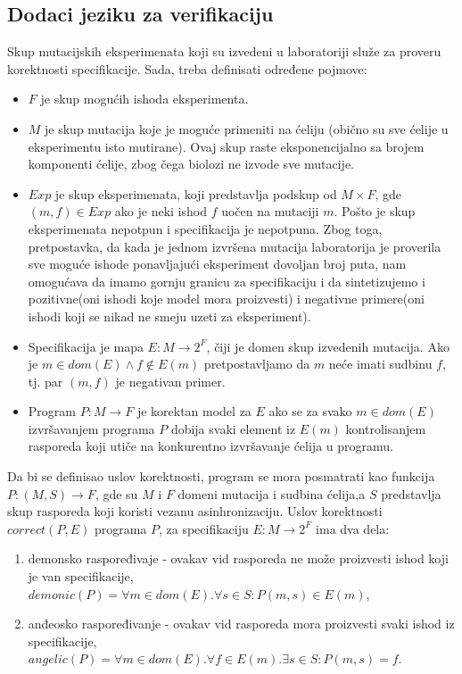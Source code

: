 \documentclass[a4paper]{article}
\begin{document}
\subsection{Dodaci jeziku za verifikaciju}
Skup mutacijskih eksperimenata koji su izvedeni u laboratoriji služe za proveru korektnosti specifikacije. Sada, treba definisati određene pojmove:
\begin{itemize}
\item $F$ je skup mogućih ishoda eksperimenta.
\item $M$ je skup mutacija koje je moguće primeniti na ćeliju (obično su sve ćelije u eksperimentu isto mutirane). Ovaj skup raste eksponencijalno sa brojem komponenti ćelije, zbog čega biolozi ne izvode sve mutacije.
\item $Exp$ je skup eksperimenata, koji predstavlja podskup od $M \times F$, gde $(m,f) \in Exp$ ako je neki ishod $f$ uočen na mutaciji $m$. Pošto je skup eksperimenata nepotpun i specifikacija je nepotpuna. Zbog toga, pretpostavka, da kada je jednom izvršena mutacija laboratorija je proverila sve moguće ishode ponavljajući eksperiment dovoljan broj puta, nam omogućava da imamo gornju granicu za specifikaciju i da sintetizujemo i pozitivne(oni ishodi koje model mora proizvesti) i negativne primere(oni ishodi koji se nikad ne smeju uzeti za eksperiment).
\item Specifikacija je mapa $E: M \rightarrow 2^F$, čiji je domen skup izvedenih mutacija. Ako je $m \in dom(E) \land f \notin E(m)$ pretpostavljamo da $m$ neće imati sudbinu $f$, tj. par $(m,f)$ je negativan primer.
\item Program $P: M \rightarrow F$ je korektan model za $E$ ako se za svako $m \in dom(E)$ izvršavanjem programa $P$ dobija svaki element iz $E(m)$ kontrolisanjem rasporeda koji utiče na konkurentno izvršavanje ćelija u programu.
\end{itemize}
Da bi se definisao uslov korektnosti, program se mora posmatrati kao funkcija $P: (M,S) \rightarrow F$, gde su $M$ i $F$ domeni mutacija i sudbina ćelija,a $S$ predstavlja skup rasporeda koji koristi vezanu asinhronizaciju. Uslov korektnosti $correct(P,E)$ programa $P$, za specifikaciju $E: M \rightarrow 2^F$ ima dva dela:
\begin{enumerate}
\item demonsko raspoređivaje - ovakav vid rasporeda ne može proizvesti ishod koji je van specifikacije, $demonic(P) = \forall m \in dom(E). \forall s \in S : P(m,s) \in E(m)$, 
\item anđeosko raspoređivanje - ovakav vid rasporeda mora proizvesti svaki ishod iz specifikacije, $angelic(P) = \forall m \in dom(E). \forall f \in E(m). \exists s \in S: P(m,s) = f$.
\end{enumerate}
\end{document}
